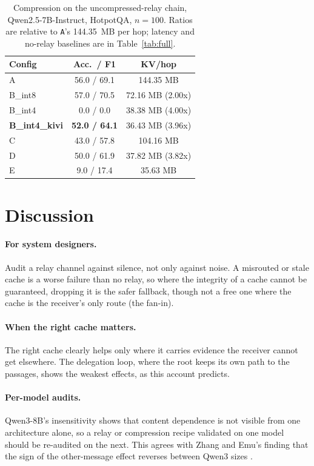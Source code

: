 \documentclass[11pt]{article}
\begin{document}
\begin{table}[t]
\centering
\small
\caption{Compression on the uncompressed-relay chain, Qwen2.5-7B-Instruct,
HotpotQA, $n{=}100$. Ratios are relative to \texttt{A}'s 144.35~MB per hop;
latency and no-relay baselines are in Table~\ref{tab:full}.}
\label{tab:main}
\begin{tabular}{lcc}
\toprule
\textbf{Config} & \textbf{Acc.\ / F1} & \textbf{KV/hop} \\
\midrule
A & 56.0 / 69.1 & 144.35 MB \\
B\_int8 & 57.0 / 70.5 & 72.16 MB (2.00x) \\
B\_int4 & 0.0 / 0.0 & 38.38 MB (4.00x) \\
\textbf{B\_int4\_kivi} & \textbf{52.0 / 64.1} & 36.43 MB (3.96x) \\
C & 43.0 / 57.8 & 104.16 MB \\
D & 50.0 / 61.9 & 37.82 MB (3.82x) \\
E & 9.0 / 17.4 & 35.63 MB \\
\bottomrule
\end{tabular}
\end{table}

\section{Discussion}

\paragraph{For system designers.} Audit a relay channel against silence,
not only against noise. A misrouted or stale cache is a worse failure than
no relay, so where the integrity of a cache cannot be guaranteed, dropping
it is the safer fallback, though not a free one where the cache is the
receiver's only route (the fan-in).

\paragraph{When the right cache matters.} The right cache clearly helps
only where it carries evidence the receiver cannot get elsewhere. The
delegation loop, where the root keeps its own path to the passages,
shows the weakest effects, as this account predicts.

\paragraph{Per-model audits.} Qwen3-8B's insensitivity shows that content
dependence is not visible from one architecture alone, so a relay or
compression recipe validated on one model should be re-audited on the
next. This agrees with Zhang and Emu's finding that the sign of the
other-message effect reverses between Qwen3 sizes \citep{zhangemu2026}.
\end{document}
